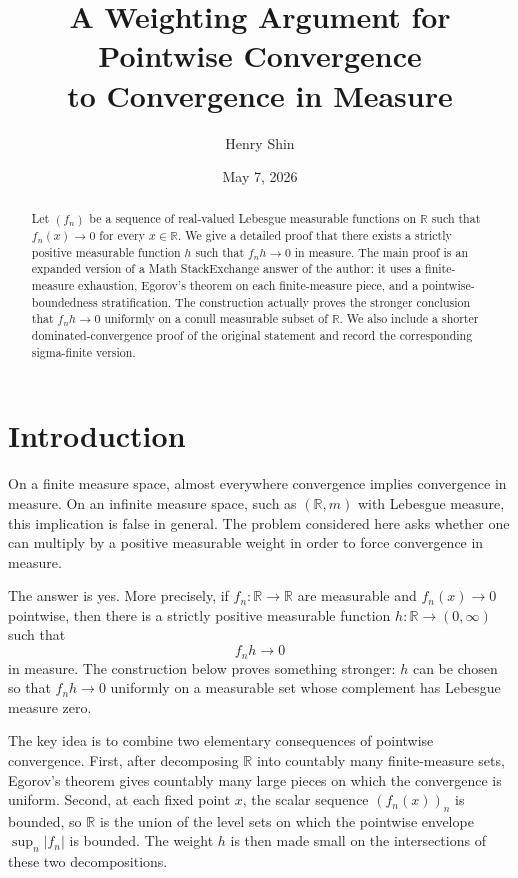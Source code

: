 \documentclass[11pt]{article}
\title{A Weighting Argument for Pointwise Convergence\\to Convergence in Measure}
\author{Henry Shin}
\date{May 7, 2026}
\newcommand{\R}{\mathbb{R}}
\theoremstyle{plain}
\theoremstyle{definition}
\theoremstyle{remark}
\begin{document}
\maketitle

\begin{abstract}
Let $(f_n)$ be a sequence of real-valued Lebesgue measurable functions on
$\R$ such that $f_n(x)\to 0$ for every $x\in\R$.  We give a detailed proof
that there exists a strictly positive measurable function $h$ such that
$f_nh\to 0$ in measure.  The main proof is an expanded version of a
Math StackExchange answer of the author: it uses a finite-measure exhaustion,
Egorov's theorem on each finite-measure piece, and a pointwise-boundedness
stratification.  The construction actually proves the stronger conclusion
that $f_nh\to 0$ uniformly on a conull measurable subset of $\R$.
We also include a shorter dominated-convergence proof of the original
statement and record the corresponding sigma-finite version.
\end{abstract}

\section{Introduction}

On a finite measure space, almost everywhere convergence implies convergence
in measure.  On an infinite measure space, such as $(\R,m)$ with Lebesgue
measure, this implication is false in general.  The problem considered here
asks whether one can multiply by a positive measurable weight in order to
force convergence in measure.

The answer is yes.  More precisely, if $f_n:\R\to\R$ are measurable and
$f_n(x)\to 0$ pointwise, then there is a strictly positive measurable
function $h:\R\to(0,\infty)$ such that
\[
        f_nh\longrightarrow 0
\]
in measure.  The construction below proves something stronger: $h$ can be
chosen so that $f_nh\to 0$ uniformly on a measurable set whose complement has
Lebesgue measure zero.

The key idea is to combine two elementary consequences of pointwise
convergence.  First, after decomposing $\R$ into countably many finite-measure
sets, Egorov's theorem gives countably many large pieces on which the
convergence is uniform.  Second, at each fixed point $x$, the scalar sequence
$(f_n(x))_n$ is bounded, so $\R$ is the union of the level sets on which the
pointwise envelope $\sup_n |f_n|$ is bounded.  The weight $h$ is then made
small on the intersections of these two decompositions.
\end{document}
